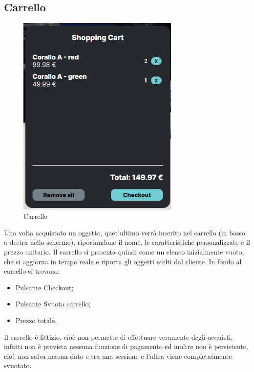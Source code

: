 \subsection{Carrello}
\begin{figure}[H]
  \renewcommand{\thefigure}{7}
\begin{center}
  \includegraphics[width=8cm]{./res/images/carrello.png}
\end{center}
  \caption{Carrello}
  \label{Carrello}
\end{figure}

Una volta acquistato un oggetto, quet'ultimo verrà inserito nel carrello (in basso a destra nello schermo), riportandone il nome, le caratteristiche personalizzate e il prezzo unitario.
Il carrello si presenta quindi come un elenco inizialmente vuoto, che si aggiorna in tempo reale e riporta gli oggetti scelti dal cliente.
In fondo al carrello si trovano:
\begin{itemize}
	\item Pulsante Checkout;
	\item Pulsante Svuota carrello;
	\item Prezzo totale.
\end{itemize}
Il carrello è fittizio, cioè non permette di effettuare veramente degli acquisti, infatti non è prevista nessuna funzione di pagamento ed inoltre non è persistente, cioè non salva nessun dato e tra una sessione e l'altra viene completatmente svuotato.
\pagebreak

